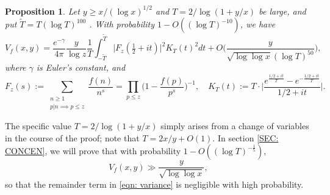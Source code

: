 \documentclass[12pt, notitlepage]{amsart}
\numberwithin{equation}{section}
\def\TT{\widetilde{T}}
\newtheorem{proposition}[theorem]{Proposition}
\theoremstyle{remark}
\theoremstyle{definition}
\theoremstyle{remark}
\numberwithin{equation}{section}
\begin{document}
\begin{proposition}\label{prop: asmpy}
Let $y\ge x/(\log x)^{1/2}$ and $T=2/\log(1+y/x)$ be large, and put $\TT = T(\log T)^{100}$ . With probability $1-O( (\log T)^{-10} )$, we have
\begin{equation}\label{eqn: variance}
    V_f(x,y) = \frac{e^{-\gamma}}{4\pi} \frac{y}{\log z} \frac{1}{T} \int_{-\TT}^{\TT} \Big|F_z(\tfrac{1}{2}+it)\Big|^{2} K_T(t)^{2} dt +O\Big(\frac{y}{\sqrt{\log \log x}(\log T)^{50}}\Big),
\end{equation}
where $\gamma$ is Euler's constant, and
\begin{equation}\label{eqn: F}
  F_z(s):=  \sum_{\substack{n\ge 1 \\ p|n \implies p\le z}} \frac{f(n)}{n^{s}} = \prod_{p \leq z}\Big(1 - \frac{f(p)}{p^s} \Big)^{-1} , \quad K_T(t):= T \cdot \Big|  \frac{e^{\frac{1/2+it}{T}} - e^{-\frac{1/2 + i t }{T} }}{ 1/2+it}\Big|.  
\end{equation}
\end{proposition}

 The specific value $T=2/\log(1+y/x)$ simply arises from a change of variables in the course of the proof; note that $T=2x/y + O(1)$.   In section \ref{SEC: CONCEN}, we will prove that with probability $1-O((\log T)^{-\frac 15})$, 
\[
V_f(x, y) \gg  \frac{y}{\sqrt{\log \log x}}, 
\]
so that the remainder term in \eqref{eqn: variance} is negligible with high probability. 
\bigskip
\end{document}
